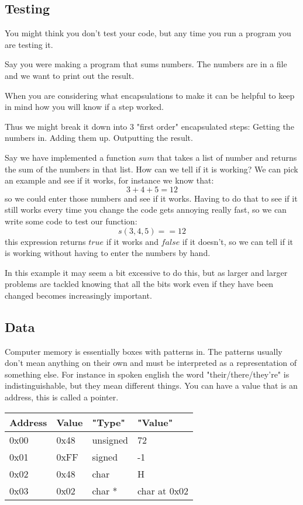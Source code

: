 \documentclass{article}
\begin{document}
\subsection{Testing}
\label{sum_example}
You might think you don't test your code, but any time you run a program you are testing it.

Say you were making a program that sums numbers.
The numbers are in a file and we want to print out the result.

When you are considering what encapsulations to make it can be helpful to keep
in mind how you will know if a step worked.

Thus we might break it down into 3 "first order" encapsulated steps:
Getting the numbers in.
Adding them up.
Outputting the result.

Say we have implemented a function $sum$ that takes a list of number and
returns the sum of the numbers in that list. How can we tell if it is working?
We can pick an example and see if it works, for instance we know that:
\begin{displaymath}
3 + 4 + 5 = 12
\end{displaymath}
so we could enter those numbers and see if it works. Having to do that to see if it still works every time you change the code gets annoying really fast, so we can write some code to test our function:
\begin{displaymath}
s(3, 4, 5) ==  12
\end{displaymath}
this expression returns $true$ if it works and $false$ if it doesn't, so we can
tell if it is working without having to enter the numbers by hand.

In this example it may seem a bit excessive to do this, but as larger and
larger problems are tackled knowing that all the bits work even if they have
been changed becomes increasingly important.

\subsection{Data}
Computer memory is essentially boxes with patterns in.
The patterns usually don't mean anything on their own and must be interpreted
as a representation of something else.
For instance in spoken english the word "their/there/they're" is
indistinguishable, but they mean different things.
You can have a value that is an address, this is called a pointer.

\begin{tabular}{| l | l || l | l |}
\hline
Address & Value & "Type" & "Value" \\
\hline
0x00 & 0x48 & unsigned & 72 \\
0x01 & 0xFF & signed & -1 \\
0x02 & 0x48 & char & H \\
0x03 & 0x02 & char * & char at 0x02 \\
\hline
\end{tabular}
\end{document}
